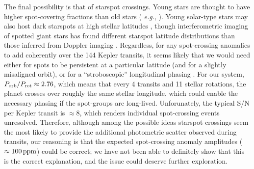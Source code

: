 \documentclass[12pt,modern,twocolumn,tighten]{aastex63}
\begin{document}
The final possibility is that of starspot crossings.  Young stars are
thought to have higher spot-covering fractions than old stars ({\it
e.g.}, \citealt{morris_relationship_2020}).  Young solar-type stars may also host
dark starspots at high stellar latitudes \citep[{\it e.g.},
EK~Dra;][]{strassmeier_starspots_2009}, though interferometric imaging
of spotted giant stars has found different starspot latitude distributions than
those inferred from Doppler imaging
\citep{roettenbacher_contemporaneous_2017}.  Regardless, for any
spot-crossing anomalies to add coherently over the 144 Kepler
transits, it seems likely that we would need either for spots to be
persistent at a particular latitude (and for a slightly misaligned
orbit), or for a ``stroboscopic'' longitudinal phasing \citep[{\it
e.g.},][]{dai_stellar_2018}.  For our system, $P_{\rm orb}/P_{\rm rot}
\approx 2.76$, which means that every 4 transits and 11 stellar
rotations, the planet crosses over roughly the same stellar longitude,
which could enable the necessary phasing if the spot-groups are
long-lived.  Unforunately, the typical S/N per Kepler transit is
$\approx8$, which renders individual spot-crossing events unresolved.
Therefore, although among the possible ideas starspot crossings seem
the most likely to provide the additional photometric scatter observed
during transits, our reasoning is that the expected
spot-crossing anomaly amplitudes ($\approx 100\,{\rm ppm}$) could be
correct; we have not been able to definitely show that this is the correct
explanation, and the issue could deserve further exploration.


%  
%  
\end{document}
